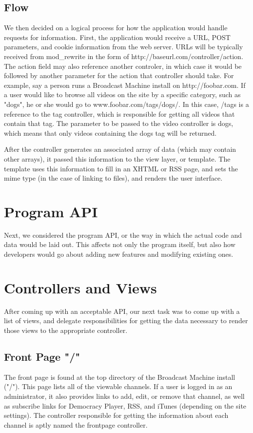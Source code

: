 \documentclass[a4paper,12pt]{report}
\begin{document}
\begin{description}
\subsection{Flow}
We then decided on a logical process for how the application would handle requests for information. First, the application would receive a URL, POST parameters, and cookie information from the web server. URLs will be typically received from mod\_rewrite in the form of http://baseurl.com/controller/action. The action field may also reference another controler, in which case it would be followed by another parameter for the action that controller should take. For example, say a person runs a Broadcast Machine install on http://foobar.com. If a user would like to browse all videos on the site by a specific category, such as "dogs", he or she would go to www.foobar.com/tags/dogs/. In this case, /tags is a reference to the tag controller, which is responsible for getting all videos that contain that tag. The parameter to be passed to the video controller is dogs, which means that only videos containing the dogs tag will be returned. 


After the controller generates an associated array of data (which may contain other arrays), it passed this information to the view layer, or template. The template uses this information to fill in an XHTML or RSS page, and sets the mime type (in the case of linking to files), and renders the user interface.


\section{Program API}
Next, we considered the program API, or the way in which the actual code and data would be laid out. This affects not only the program itself, but also how developers would go about adding new features and modifying existing ones.


\section{Controllers and Views}
After coming up with an acceptable API, our next task was to come up with a list of views, and delegate responsibilities for getting the data necessary to render those views to the appropriate controller.


\subsection{Front Page "/"}
The front page is found at the top directory of the Broadcast Machine install ("/"). This page lists all of the viewable channels. If a user is logged in as an administrator, it also provides links to add, edit, or remove that channel, as well as subscribe links for Democracy Player, RSS, and iTunes (depending on the site settings). The controller responsible for getting the information about each channel is aptly named the frontpage controller.



\end{description}
\end{document}
